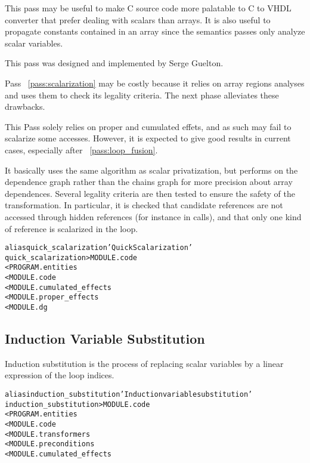 \documentclass[a4paper]{report}
\newenvironment{PipsMake}{\begin{alltt}}{\end{alltt}}
\newcommand{\PipsPassRef}[1]{\texttt{\detokenize{#1}}~\ref{pass:#1}}
\newenvironment{PipsPass}[1]{\label{pass:#1}}{}
\begin{document}
This pass may be useful to make C source code more palatable to C to VHDL
converter that prefer dealing with scalars than arrays. It is also useful
to propagate constants contained in an array since the semantics passes
only analyze scalar variables.


This pass was designed and implemented by Serge Guelton.

Pass \PipsPassRef{scalarization} may be costly because it relies on
array regions analyses and uses them to check its legality
criteria. The next phase alleviates these drawbacks.

\begin{PipsPass}{quick_scalarization}
  This Pass solely relies on proper and cumulated effets, and as such
  may fail to scalarize some accesses. However, it is expected to give
  good results in current cases, especially after
  \PipsPassRef{loop_fusion}.

  It basically uses the same algorithm as scalar privatization, but
  performs on the dependence graph rather than the chains graph for
  more precision about array dependences. Several legality criteria
  are then tested to ensure the safety of the transformation. In
  particular, it is checked that candidate references are not accessed
  through hidden references (for instance in calls), and that only one
  kind of reference is scalarized in the loop.
\end{PipsPass}


\begin{PipsMake}
alias quick_scalarization 'Quick Scalarization'
quick_scalarization  > MODULE.code
        < PROGRAM.entities
        < MODULE.code
        < MODULE.cumulated_effects
        < MODULE.proper_effects
        < MODULE.dg
\end{PipsMake}


\subsection{Induction Variable Substitution}

\begin{PipsPass}{induction_substitution}
Induction substitution is the process of replacing scalar variables
by a linear expression of the loop indices.
\end{PipsPass}


\begin{PipsMake}
alias induction_substitution 'Induction variable substitution'
induction_substitution > MODULE.code
        < PROGRAM.entities
        < MODULE.code
        < MODULE.transformers
        < MODULE.preconditions
        < MODULE.cumulated_effects
\end{PipsMake}
\end{document}
